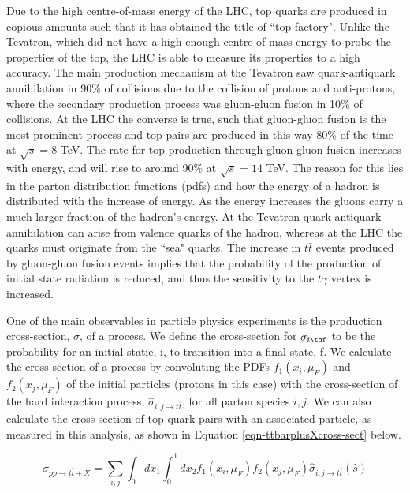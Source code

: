 Due to the high centre-of-mass energy of the LHC, top quarks are produced in copious amounts such that it has obtained the title of ``top factory". Unlike the Tevatron, which did not have a high enough centre-of-mass energy to probe the properties of the top, the LHC is able to measure its properties to a high accuracy. The main production mechanism at the Tevatron saw quark-antiquark annihilation in 90\% \cite{Kidonakis:2012db} of collisions due to the collision of protons and anti-protons, where the secondary production process was gluon-gluon fusion in 10\% of collisions. At the LHC the converse is true, such that gluon-gluon fusion is the most prominent process and top pairs are produced in this way 80\% of the time at $\sqrt{s} = 8$ TeV. The rate for top production through gluon-gluon fusion increases with energy, and will rise to around 90\% at $\sqrt{s} = 14$ TeV. The reason for this lies in the parton distribution functions (pdfs) and how the energy of a hadron is distributed with the increase of energy. As the energy increases the gluons carry a much larger fraction of the hadron's energy. At the Tevatron quark-antiquark annihilation can arise from valence quarks of the hadron, whereas at the LHC the quarks must originate from the ``sea" quarks. The increase in $t\bar{t}$ events produced by gluon-gluon fusion events implies that the probability of the production of initial state radiation is reduced, and thus the sensitivity to the $t\gamma$ vertex is increased.

One of the main observables in particle physics experiments is the production cross-section, $\sigma$, of a process. We define the cross-section for $\sigma_{i\tof}$ to be the probability for an initial statie, i, to transition into a final state, f. We calculate the cross-section of a process by convoluting the PDFs $f_1(x_i, \mu_F)$ and $f_2(x_j, \mu_F)$ of the initial particles (protons in this case) with the cross-section of the hard interaction process, $\hat{\sigma}_{i,j \to t\bar{t}}$, for all parton species $i,j$. We can also calculate the cross-section of top quark pairs with an associated particle, as measured in this analysis, as shown in Equation \ref{eqn-ttbarplusXcross-sect} below.

\begin{equation} \label{eqn-ttbarplusXcross-sect}
\sigma_{pp \to t\bar{t}+X} = \sum_{i,j} \int^1_0 dx_1 \int^1_0 dx_2 f_1(x_i, \mu_F)f_2(x_j, \mu_F)\hat{\sigma}_{i,j \to t\bar{t}}(\hat{s})
\end{equation}

